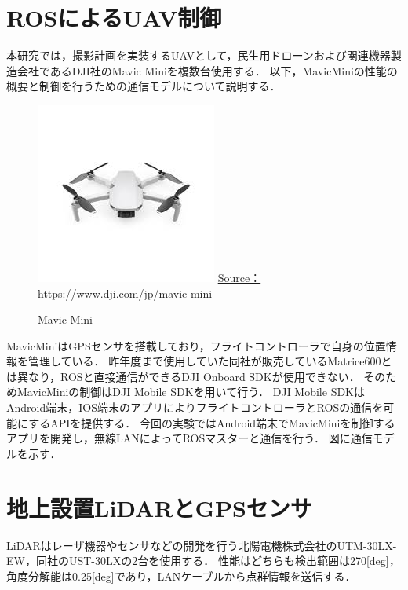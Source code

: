 \documentclass[autodetect-engine,dvipdfmx-if-dvi,ja=standard,a4j,jbase=11pt,magstyle=nomag*]{bxjsreport}
\begin{document}
\section{ROSによるUAV制御}
本研究では，撮影計画を実装するUAVとして，民生用ドローンおよび関連機器製造会社であるDJI社のMavic Miniを複数台使用する．
以下，MavicMiniの性能の概要と制御を行うための通信モデルについて説明する．

\begin{figure}[h]
    \centering
    \includegraphics[width=0.7\linewidth, clip]{./figure/chapter4/mavic_mini.jpg}
    \url{Source：https://www.dji.com/jp/mavic-mini}
    \caption{Mavic Mini}
    \label{fig:mavic_mini}
\end{figure}

MavicMiniはGPSセンサを搭載しており，フライトコントローラで自身の位置情報を管理している．
昨年度まで使用していた同社が販売しているMatrice600とは異なり，ROSと直接通信ができるDJI Onboard SDKが使用できない．
そのためMavicMiniの制御はDJI Mobile SDKを用いて行う．
DJI Mobile SDKはAndroid端末，IOS端末のアプリによりフライトコントローラとROSの通信を可能にするAPIを提供する．
今回の実験ではAndroid端末でMavicMiniを制御するアプリを開発し，無線LANによってROSマスターと通信を行う．
図に通信モデルを示す．



\section{地上設置LiDARとGPSセンサ}
LiDARはレーザ機器やセンサなどの開発を行う北陽電機株式会社のUTM-30LX-EW，同社のUST-30LXの2台を使用する．
性能はどちらも検出範囲は270[deg]，角度分解能は0.25[deg]であり，LANケーブルから点群情報を送信する．
\end{document}
